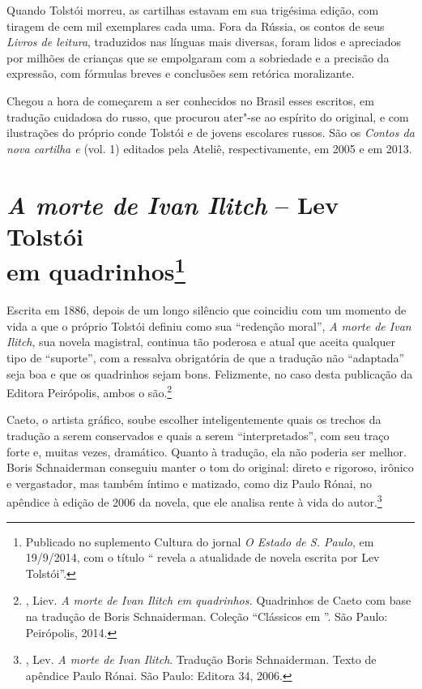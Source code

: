 Quando Tolstói morreu, as cartilhas estavam em sua trigésima
edição, com tiragem de cem mil exemplares cada uma. Fora da
Rússia, os contos de seus \emph{Livros de leitura}, traduzidos
nas línguas mais diversas, foram lidos e apreciados por milhões
de crianças que se empolgaram com a sobriedade e a precisão da
expressão, com fórmulas breves e conclusões sem retórica
moralizante.

Chegou a hora de começarem a ser conhecidos no Brasil esses
escritos, em tradução cuidadosa do russo, que procurou ater"-se
ao espírito do original, e com ilustrações do próprio conde
Tolstói e de jovens escolares russos. São os \emph{Contos da
nova cartilha  e } (vol. 1) editados pela
Ateliê, respectivamente, em 2005 e em 2013.



\chapter{\emph{A morte de Ivan Ilitch} -- Lev Tolstói\\ em quadrinhos\footnote{Publicado no suplemento Cultura do jornal \emph{O Estado de S. Paulo}, em 19/9/2014, com o título ``\protect{} revela a atualidade de novela escrita por Lev Tolstói''.}}
\label{ivan}

Escrita em 1886, depois de um longo silêncio que coincidiu
com um momento de vida a que o próprio Tolstói definiu como
sua ``redenção moral'', \emph{A morte de Ivan Ilitch}, sua
novela magistral, continua tão poderosa e atual que aceita
qualquer tipo de ``suporte'', com a ressalva obrigatória de que
a tradução não ``adaptada'' seja boa e que os quadrinhos sejam
bons. Felizmente, no caso desta publicação da Editora Peirópolis,
ambos o são.\footnote{, Liev. \emph{A morte de
Ivan Ilitch em quadrinhos.} Quadrinhos de Caeto com base na
tradução de Boris Schnaiderman. Coleção ``Clássicos em
''. São Paulo: Peirópolis, 2014.} 

Caeto, o artista gráfico, soube escolher inteligentemente quais os
trechos da tradução a serem conservados e quais a serem ``interpretados'', com seu traço forte e, muitas vezes, dramático.
Quanto à tradução, ela não poderia ser melhor. Boris Schnaiderman
conseguiu manter o tom do original: direto e rigoroso, irônico e
vergastador, mas também íntimo e matizado, como diz Paulo Rónai,
no apêndice à edição de 2006 da novela, que ele analisa rente à
vida do autor.\footnote{, Lev. \emph{A morte de
Ivan Ilitch}. Tradução Boris Schnaiderman. Texto de apêndice
Paulo Rónai. São Paulo: Editora 34, 2006.}

